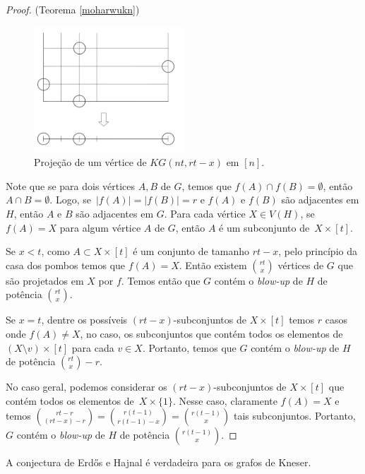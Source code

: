 \begin{proof}{(Teorema \ref{moharwukn})}
\begin{figure}[H]
\centering
\includegraphics[width=0.5\textwidth]{figuras/ch_kneser/kneser-projection.png}
\caption{Projeção de um vértice de $KG(nt,rt-x)$ em $[n]$.}
\label{fig:kneserprojection}
\end{figure}

Note que se para dois vértices $A,B$ de $G$, temos que $f(A)\cap f(B) = \emptyset$, então $A\cap B = \emptyset$. Logo, se~$|f(A)| = |f(B)| = r$ e $f(A)$ e $f(B)$ são adjacentes em $H$, então $A$ e $B$ são adjacentes em $G$. Para cada vértice $X\in V(H)$, se $f(A) = X$ para algum vértice $A$ de $G$, então $A$ é um subconjunto de~$X \times [t]$.

Se $x<t$, como $A \subset X \times [t]$ é um conjunto de tamanho $rt-x$, pelo princípio da casa dos pombos temos que $f(A) = X$. Então existem $\binom{rt}{x}$ vértices de $G$ que são projetados em $X$ por $f$. Temos então que $G$ contém o \textit{blow-up} de $H$ de potência $\binom{rt}{x}$.

Se $x=t$, dentre os possíveis $(rt-x)$-subconjuntos de $X \times [t]$ temos $r$ casos onde $f(A) \neq X$, no caso, os subconjuntos que contém todos os elementos de $(X\setminus v) \times [t]$ para cada $v\in X$. Portanto, temos que $G$ contém o \textit{blow-up} de $H$ de potência $\binom{rt}{x}-r$.

No caso geral, podemos considerar os $(rt-x)$-subconjuntos de $X\times [t]$ que contém todos os elementos de~$X \times \{1\}$. Nesse caso, claramente $f(A) = X$ e temos $\binom{rt-r}{(rt-x)-r} = \binom{r(t-1)}{r(t-1)-x} = \binom{r(t-1)}{x}$ tais subconjuntos. Portanto, $G$ contém o \textit{blow-up} de $H$ de potência $\binom{r(t-1)}{x}$.
\end{proof}

\begin{corolario}\label{knesercor}
A conjectura de Erd\H{o}s e Hajnal é verdadeira para os grafos de Kneser.
\end{corolario}

